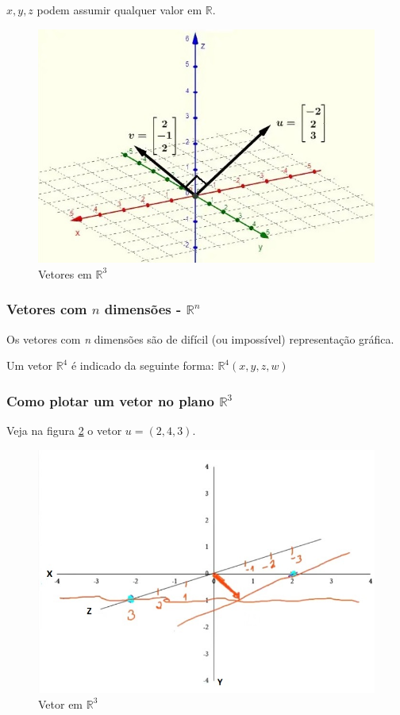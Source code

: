 \documentclass[12pt]{article}
\begin{document}
\(x, y, z\) podem assumir qualquer valor em \(\mathbb{R}\).

\begin{figure}[H]
	\centering
	\includegraphics[width=0.5\linewidth]{"figuras/vetores R3"}
	\caption[Vetores em \( \mathbf{R}^{3} \)]{Vetores em \(\mathbb{R}^3\)}
	\label{fig:vetores-r3}
\end{figure}

\subsubsection{Vetores com \(n\) dimensões - \(\mathbb{R}^n\)}

Os vetores com \textit{n} dimensões são de difícil (ou impossível) representação gráfica.

Um vetor \(\mathbb{R}^4\) é indicado da seguinte forma: \(\mathbb{R}^4 (x, y, z, w)\)

\subsubsection{Como plotar um vetor no plano \(\mathbb{R}^3\)}

Veja na figura \ref{fig:vetor r3} o vetor \(u = (2,4,3)\).

\begin{figure}
	\centering
	\includegraphics[width=0.7\linewidth]{figuras/R3}
	\caption[Vetor em \( \mathbf{R}^{3} \)]{Vetor em \(\mathbb{R}^3\)}
	\label{fig:vetor r3}
\end{figure}
\end{document}
